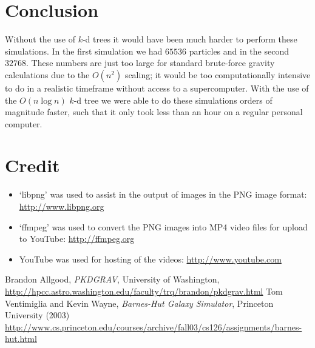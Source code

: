 \documentclass[11pt]{article}
\begin{document}
\section{Conclusion}
Without the use of $k$-d trees it would have been much harder to perform these simulations.
In the first simulation we had $65536$ particles and in the second $32768$.
These numbers are just too large for standard brute-force gravity calculations due to the $O(n^2)$ scaling;  it would be too computationally intensive to do in a realistic timeframe without access to a supercomputer.
With the use of the $O(n \log n)$ $k$-d tree we were able to do these simulations orders of magnitude faster, such that it only took less than an hour on a regular personal computer.

\section{Credit}
\begin{itemize}
\item `libpng' was used to assist in the output of images in the PNG image format: \url{http://www.libpng.org}
\item `ffmpeg' was used to convert the PNG images into MP4 video files for upload to YouTube: \url{http://ffmpeg.org}
\item YouTube was used for hosting of the videos: \url{http://www.youtube.com}
\end{itemize}

\begin{thebibliography}{9}
		Brandon Allgood, \emph{PKDGRAV}, University of Washington, \url{http://hpcc.astro.washington.edu/faculty/trq/brandon/pkdgrav.html}
		Tom Ventimiglia and Kevin Wayne, \emph{Barnes-Hut Galaxy Simulator}, Princeton University (2003) \url{http://www.cs.princeton.edu/courses/archive/fall03/cs126/assignments/barnes-hut.html}
\end{thebibliography}
\end{document}
